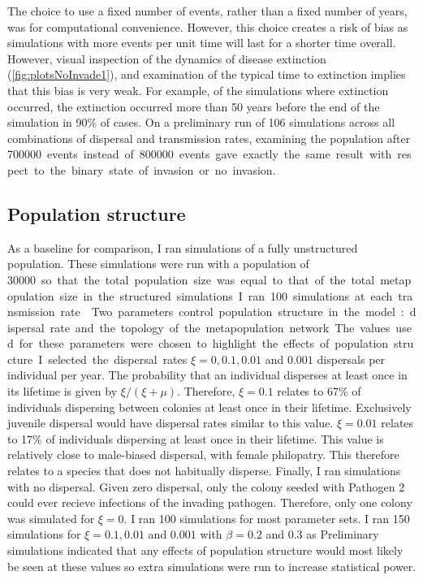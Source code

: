 The choice to use a fixed number of events, rather than a fixed number of years, was for computational convenience.
However, this choice creates a risk of bias as simulations with more events per unit time will last for a shorter time overall.
However, visual inspection of the dynamics of disease extinction (\ref{fig:plotsNoInvade1}), and examination of the typical time to extinction implies that this bias is very weak.
For example, of the simulations where extinction occurred, the extinction occurred more than 50 years before the end of the simulation in 90\% of cases.
On a preliminary run of 106 simulations across all combinations of dispersal and transmission rates, examining the population after \SI{700000} events instead of \SI{800000} events gave exactly the same result with respect to the binary state of invasion or no invasion. 


\subsection{Population structure}

As a baseline for comparison, I ran simulations of a fully unstructured population.
These simulations were run with a population of \SI{30000} so that the total population size was equal to that of the total metapopulation size in the structured simulations.
I ran 100 simulations at each transmission rate.




Two parameters control population structure in the model: dispersal rate and the topology of the metapopulation network.
The values used for these parameters were chosen to highlight the effects of population structure. 
I selected the dispersal rates $\xi = 0, 0.1, 0.01$ and $ 0.001$ dispersals per individual per year. 
The probability that an individual disperses at least once in its lifetime is given by $\xi / \left(\xi + \mu\right)$.
Therefore, $\xi = 0.1$ relates to 67\% of individuals dispersing between colonies at least once in their lifetime. 
Exclusively juvenile dispersal would have dispersal rates similar to this value. %
$\xi = 0.01$ relates to 17\% of individuals dispersing at least once in their lifetime.
This value is relatively close to male-biased dispersal, with female philopatry. %
This therefore relates to a species that does not habitually disperse.
Finally, I ran simulations with no dispersal.
Given zero dispersal, only the colony seeded with Pathogen 2 could ever recieve infections of the invading pathogen.
Therefore, only one colony was simulated for $\xi = 0$.
I ran 100 simulations for most parameter sets.
I ran 150 simulations for $\xi = 0.1, 0.01$ and $0.001$ with $\beta = 0.2$ and $0.3$ as
Preliminary simulations indicated that any effects of population structure would most likely be seen at these values so extra simulations were run to increase statistical power. 



